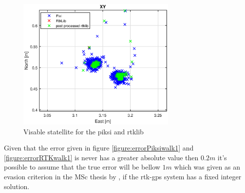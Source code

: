 \begin{figure}[H]
	\centering
		\includegraphics[width=0.7\textwidth]{figs/plots/enhancedxywalk1.eps}
		\caption{Visable statellite for the piksi and rtklib}
		\label{figure:enhancedxywalk1}
\end{figure}
Given that the error given in figure \ref{figure:errorPiksiwalk1} and \ref{figure:errorRTKwalk1} is never has a greater absolute value then $0.2m$ it's possible to assume that the true error will be bellow $1m$ which was given as an evasion criterion in the MSc thesis by \citep{Froelich}, if the \gls{rtk-gps} system has a fixed integer solution.

